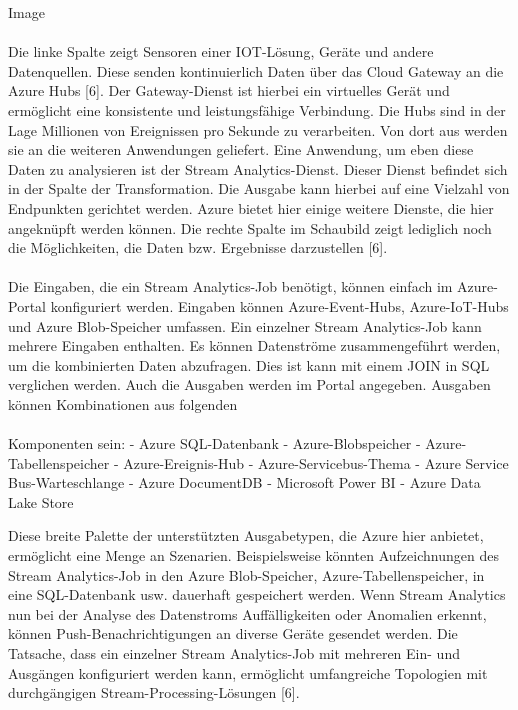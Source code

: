 Image\\ \\
Die linke Spalte zeigt Sensoren einer IOT-Lösung, Geräte und andere Datenquellen. Diese senden kontinuierlich Daten über das Cloud Gateway an die Azure Hubs [6]. Der Gateway-Dienst ist hierbei ein virtuelles Gerät und ermöglicht eine konsistente und leistungsfähige Verbindung. Die Hubs sind in der Lage Millionen von Ereignissen pro Sekunde zu verarbeiten. Von dort aus werden sie an die weiteren Anwendungen geliefert. Eine Anwendung, um eben diese Daten zu analysieren ist der Stream Analytics-Dienst. Dieser Dienst befindet sich in der Spalte der Transformation. Die Ausgabe kann hierbei auf eine Vielzahl von Endpunkten gerichtet werden. Azure bietet hier einige weitere Dienste, die hier angeknüpft werden können. Die rechte Spalte im Schaubild zeigt lediglich noch die Möglichkeiten, die Daten bzw. Ergebnisse darzustellen [6].\\ \\
Die Eingaben, die ein Stream Analytics-Job benötigt, können einfach im Azure-Portal konfiguriert werden. Eingaben können Azure-Event-Hubs, Azure-IoT-Hubs und Azure Blob-Speicher umfassen. Ein einzelner Stream Analytics-Job kann mehrere Eingaben enthalten. Es können Datenströme zusammengeführt werden, um die kombinierten Daten abzufragen. Dies ist kann mit einem JOIN in SQL verglichen werden. Auch die Ausgaben werden im Portal angegeben. Ausgaben können Kombinationen aus folgenden\\ \\ Komponenten sein:
-	Azure SQL-Datenbank 
-	Azure-Blobspeicher 
-	Azure-Tabellenspeicher 
-	Azure-Ereignis-Hub 
-	Azure-Servicebus-Thema 
-	Azure Service Bus-Warteschlange 
-	Azure DocumentDB 
-	Microsoft Power BI 
-	Azure Data Lake Store 

Diese breite Palette der unterstützten Ausgabetypen, die Azure hier anbietet, ermöglicht eine Menge an Szenarien. Beispielsweise könnten Aufzeichnungen des Stream Analytics-Job in den Azure Blob-Speicher, Azure-Tabellenspeicher, in eine SQL-Datenbank usw. dauerhaft gespeichert werden. Wenn Stream Analytics nun bei der Analyse des Datenstroms Auffälligkeiten oder Anomalien erkennt, können Push-Benachrichtigungen an diverse Geräte gesendet werden. Die Tatsache, dass ein einzelner Stream Analytics-Job mit mehreren Ein- und Ausgängen konfiguriert werden kann, ermöglicht umfangreiche Topologien mit durchgängigen Stream-Processing-Lösungen [6].

